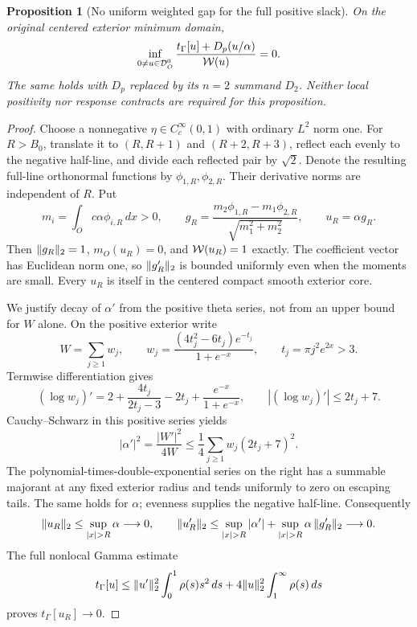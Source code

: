 \documentclass[11pt,a4paper]{article}
\numberwithin{equation}{section}
\newtheorem{proposition}[theorem]{Proposition}
\theoremstyle{definition}\newtheorem{definition}[theorem]{Definition}
\theoremstyle{remark}\newtheorem{remark}[theorem]{Remark}
\newcommand{\tg}{t_\Gamma}\newcommand{\cg}{c_\Gamma}
\begin{document}
\begin{proposition}[No uniform weighted gap for the full positive slack]\label{c:prop:nogap}
On the original centered exterior minimum domain,
\begin{equation}\label{c:eq:nogap}
 \inf_{0\ne u\in\D_O^0}
 \frac{\tg[u]+D_p(u/\alpha)}{\wo(u)}=0.
\end{equation}
The same holds with $D_p$ replaced by its $n=2$ summand $D_2$.
Neither local positivity nor response contracts are required for this proposition.
\end{proposition}
\begin{proof}
Choose a nonnegative $\eta\in C_c^\infty(0,1)$ with ordinary $L^2$ norm one.
For $R>{B_0}$, translate it to $(R,R+1)$ and $(R+2,R+3)$, reflect each evenly to the negative half-line, and divide each reflected pair by $\sqrt2$.
Denote the resulting full-line orthonormal functions by $\phi_{1,R},\phi_{2,R}$.
Their derivative norms are independent of $R$.
Put
\[
 m_i=\int_O c\alpha\phi_{i,R}\,dx>0,\qquad
 g_R=\frac{m_2\phi_{1,R}-m_1\phi_{2,R}}{\sqrt{m_1^2+m_2^2}},
 \qquad u_R=\alpha g_R.
\]
Then $\lVert g_R\rVert_2=1$, $m_O(u_R)=0$, and $\mathcal W(u_R)=1$ exactly.
The coefficient vector has Euclidean norm one, so $\lVert g_R'\rVert_2$ is bounded uniformly even when the moments are small.
Every $u_R$ is itself in the centered compact smooth exterior core.

We justify decay of $\alpha'$ from the positive theta series, not from an upper bound for $W$ alone.
On the positive exterior write
\[
 W=\sum_{j\ge1}w_j,\qquad
 w_j=\frac{(4t_j^2-6t_j)e^{-t_j}}{1+e^{-x}},\qquad
 t_j=\pi j^2e^{2x}>3.
\]
Termwise differentiation gives
\[
 (\log w_j)'=2+\frac{4t_j}{2t_j-3}-2t_j+
 \frac{e^{-x}}{1+e^{-x}},\qquad
 |(\log w_j)'|\le2t_j+7.
\]
Cauchy--Schwarz in this positive series yields
\begin{equation}\label{c:eq:alphaprimedecay}
 |\alpha'|^2=\frac{|W'|^2}{4W}
 \le\frac14\sum_{j\ge1}w_j(2t_j+7)^2.
\end{equation}
The polynomial-times-double-exponential series on the right has a summable majorant at any fixed exterior radius and tends uniformly to zero on escaping tails. The same holds for $\alpha$; evenness supplies the negative half-line.
Consequently
\[
 \norm{u_R}_2\le\sup_{|x|>R}\alpha\longrightarrow0,\qquad
 \norm{u_R'}_2\le\sup_{|x|>R}|\alpha'|
 +\sup_{|x|>R}\alpha\,\norm{g_R'}_2\longrightarrow0.
\]
The full nonlocal Gamma estimate
\[
 \tg[u]\le\norm{u'}_2^2\int_0^1\rho(s)s^2\,ds
 +4\norm u_2^2\int_1^\infty\rho(s)\,ds
\]
proves $\tg[u_R]\to0$.


\end{proof}
\end{document}

